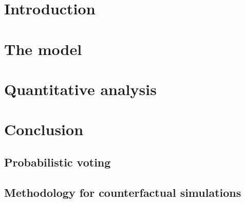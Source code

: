 \begin{refsection}

    
    \section{Introduction} \label{chap1-introduction}
    
    
    \section{The model} \label{chap1-theory}
    
    
    \section{Quantitative analysis} \label{chap1-quantitative}
    
    
    \section{Conclusion} \label{chap1-conclusion}
    
    
    \printbibliography[heading=subbibintoc]
    
    \clearpage
    \renewcommand{\thesubsection}{\thechapter.\Alph{subsection}}
    
    
    \subsection{Probabilistic voting} \label{chap1-probabilistic}
    
    \clearpage
    \subsection{Methodology for counterfactual simulations}\label{chap1-countermetho}
    

\end{refsection}